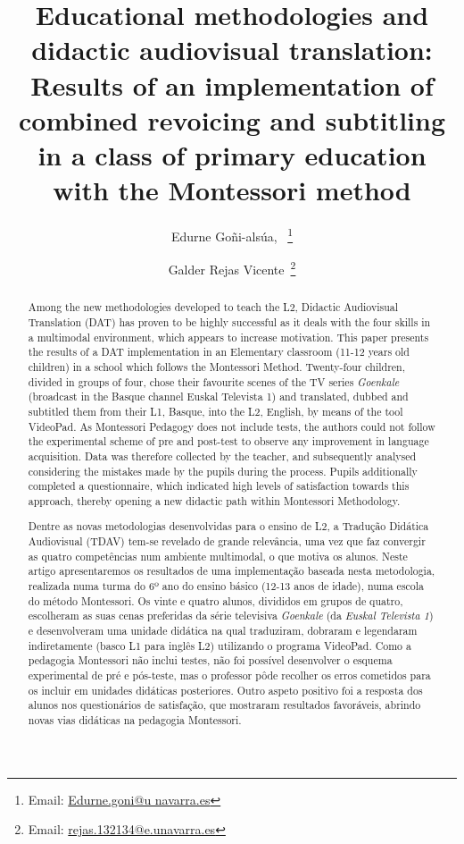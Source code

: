 \documentclass[english]{textolivre}
\title{Educational methodologies and didactic audiovisual translation: Results of an implementation of combined revoicing and subtitling in a class of primary education with the Montessori method}
\author[1]{Edurne Goñi-alsúa, ~\orcid{0000-0002-7488-2689}\thanks{Email: \href{Edurne.goni@unavarra.es}{Edurne.goni@u navarra.es}}}\affil[1]{Universidad Pública de Navarra, Pamplona, Spain.}
\author[1]{Galder Rejas Vicente~\orcid{0009-0007-4495-100X}\thanks{Email: \href{rejas.132134@e.unavarra.es}{rejas.132134@e.unavarra.es}}}
\begin{document}
\maketitle
\begin{polyabstract}
\begin{english}
  \begin{abstract}
      Among the new methodologies developed to teach the L2, Didactic Audiovisual Translation (DAT) has proven to be highly successful as it deals with the four skills in a multimodal environment, which appears to increase motivation. This paper presents the results of a DAT implementation in an Elementary classroom (11-12 years old children) in a school which follows the Montessori Method. Twenty-four children, divided in groups of four, chose their favourite scenes of the TV series \emph{Goenkale} (broadcast in the Basque channel Euskal Televista 1) and translated, dubbed and subtitled them from their L1, Basque, into the L2, English, by means of the tool VideoPad. As Montessori Pedagogy does not include tests, the authors could not follow the experimental scheme of pre and post-test to observe any improvement in language acquisition. Data was therefore collected by the teacher, and subsequently analysed considering the mistakes made by the pupils during the process.  Pupils additionally completed a questionnaire, which indicated high levels of satisfaction towards this approach, thereby opening a new didactic path within Montessori Methodology. 

  \end{abstract}
\end{english}

\begin{portuguese}
\begin{abstract}
    Dentre as novas metodologias desenvolvidas para o ensino de L2, a Tradução Didática Audiovisual (TDAV) tem-se revelado de grande relevância, uma vez que faz convergir as quatro competências num ambiente multimodal, o que motiva os alunos. Neste artigo apresentaremos os resultados de uma implementação baseada nesta metodologia, realizada numa turma do 6º ano do ensino básico (12-13 anos de idade), numa escola do método Montessori. Os vinte e quatro alunos, divididos em grupos de quatro, escolheram as suas cenas preferidas da série televisiva \emph{Goenkale} (da \emph{Euskal Televista 1}) e desenvolveram uma unidade didática na qual traduziram, dobraram e legendaram indiretamente (basco L1 para inglês L2) utilizando o programa VideoPad. Como a pedagogia Montessori não inclui testes, não foi possível desenvolver o esquema experimental de pré e pós-teste, mas o professor pôde recolher os erros cometidos para os incluir em unidades didáticas posteriores. Outro aspeto positivo foi a resposta dos alunos nos questionários de satisfação, que mostraram resultados favoráveis, abrindo novas vias didáticas na pedagogia Montessori.  


\end{abstract}
\end{portuguese}
\end{polyabstract}
\end{document}
